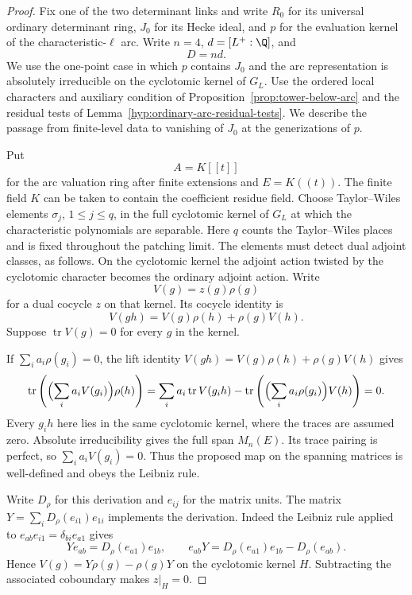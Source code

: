 \begin{proof}

Fix one of the two determinant links and write \(R_0\) for its
universal ordinary determinant ring, \(J_0\) for its Hecke ideal,
and \(p\) for the evaluation kernel of the characteristic-\(\ell\)
arc. Write \(n=4\), \(d=[L^+:\Q]\), and
\[
 D=nd.
\]
We use the
one-point case in which \(p\) contains \(J_0\) and the arc
representation is absolutely irreducible on the cyclotomic kernel
of \(G_L\). Use the ordered local characters and auxiliary condition
of Proposition~\ref{prop:tower-below-arc}
and the residual tests of Lemma~\ref{hyp:ordinary-arc-residual-tests}. We describe
the passage from finite-level data to vanishing of \(J_0\) at the
generizations of \(p\).

Put
\[
 A=K[[t]]
\]
for the arc valuation ring after finite
extensions and \(E=K((t))\). The finite field \(K\) can be taken
to contain the coefficient residue field. Choose Taylor--Wiles
elements \(\sigma_j\), \(1\le j\le q\), in the full cyclotomic
kernel of \(G_L\) at which the characteristic polynomials are
separable. Here \(q\) counts the Taylor--Wiles places and is
fixed throughout the patching limit. The elements must detect
dual adjoint classes, as follows. On the cyclotomic kernel the
adjoint action twisted by the cyclotomic character becomes the
ordinary adjoint action. Write
\[
 V(g)=z(g)\rho(g)
\]
for a dual
cocycle \(z\) on that kernel. Its cocycle identity is
\[
 V(gh)=V(g)\rho(h)+\rho(g)V(h).
\]
Suppose \(\operatorname{tr} V(g)=0\) for every \(g\) in the
kernel.

If \(\sum_i a_i\rho(g_i)=0\), the lift identity
\(V(gh)=V(g)\rho(h)+\rho(g)V(h)\) gives
\[
 \operatorname{tr}\left(\Bigl(\sum_i a_i V(g_i)\Bigr)\rho(h)\right)
  = \sum_i a_i\operatorname{tr}V(g_i h)
        -\operatorname{tr}\left(\Bigl(\sum_i a_i\rho(g_i)\Bigr)V(h)\right)
  =0.
\]
Every \(g_i h\) here lies in the same cyclotomic kernel,
where the traces are assumed zero.
Absolute irreducibility gives the full span \(M_n(E)\).
Its trace pairing is perfect, so \(\sum_i a_i V(g_i)=0\).
Thus the proposed map on the spanning matrices is well-defined
and obeys the Leibniz rule.

Write \(D_\rho\) for this derivation and
\(e_{ij}\) for the matrix units. The matrix
\(Y=\sum_i D_\rho(e_{i1})e_{1i}\) implements the derivation.
Indeed the Leibniz rule applied to \(e_{ab}e_{i1}=\delta_{bi}e_{a1}\) gives
\[
 Ye_{ab}=D_\rho(e_{a1})e_{1b},\qquad
 e_{ab}Y=D_\rho(e_{a1})e_{1b}-D_\rho(e_{ab}).
\]
Hence \(V(g)=Y\rho(g)-\rho(g)Y\) on the cyclotomic kernel \(H\).
Subtracting the associated coboundary makes \(z|_H=0\).


\end{proof}
